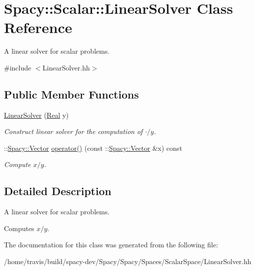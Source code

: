 \hypertarget{classSpacy_1_1Scalar_1_1LinearSolver}{\section{\-Spacy\-:\-:\-Scalar\-:\-:\-Linear\-Solver \-Class \-Reference}
\label{classSpacy_1_1Scalar_1_1LinearSolver}
}


\-A linear solver for scalar problems.  




{\ttfamily \#include $<$\-Linear\-Solver.\-hh$>$}

\subsection*{\-Public \-Member \-Functions}
\begin{DoxyCompactItemize}
\item 
\hypertarget{classSpacy_1_1Scalar_1_1LinearSolver_af7d7759b5ee27d7a16640baf1fa663d9}{\hyperlink{classSpacy_1_1Scalar_1_1LinearSolver_af7d7759b5ee27d7a16640baf1fa663d9}{\-Linear\-Solver} (\hyperlink{classSpacy_1_1Real}{\-Real} y)}\label{classSpacy_1_1Scalar_1_1LinearSolver_af7d7759b5ee27d7a16640baf1fa663d9}

\begin{DoxyCompactList}\small\item\em \-Construct linear solver for the computation of $\cdot/y$. \end{DoxyCompactList}\item 
\hypertarget{classSpacy_1_1Scalar_1_1LinearSolver_a2acd32e9eede5a5e868c85a8f62b757b}{\-::\hyperlink{classSpacy_1_1Vector}{\-Spacy\-::\-Vector} \hyperlink{classSpacy_1_1Scalar_1_1LinearSolver_a2acd32e9eede5a5e868c85a8f62b757b}{operator()} (const \-::\hyperlink{classSpacy_1_1Vector}{\-Spacy\-::\-Vector} \&x) const }\label{classSpacy_1_1Scalar_1_1LinearSolver_a2acd32e9eede5a5e868c85a8f62b757b}

\begin{DoxyCompactList}\small\item\em \-Compute $x/y$. \end{DoxyCompactList}\end{DoxyCompactItemize}


\subsection{\-Detailed \-Description}
\-A linear solver for scalar problems. 

\-Computes $x/y$. 

\-The documentation for this class was generated from the following file\-:\begin{DoxyCompactItemize}
\item 
/home/travis/build/spacy-\/dev/\-Spacy/\-Spacy/\-Spaces/\-Scalar\-Space/\-Linear\-Solver.\-hh\end{DoxyCompactItemize}
